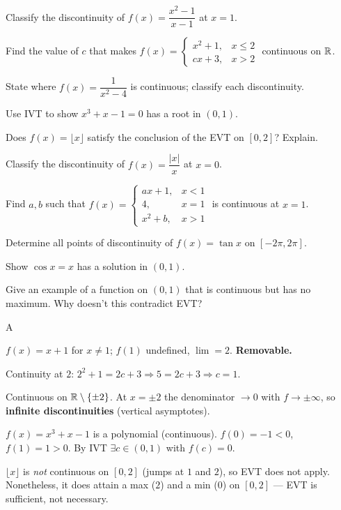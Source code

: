\documentclass[11pt]{article}
\begin{document}
\begin{problems}
\item Classify the discontinuity of $f(x) = \dfrac{x^2 - 1}{x - 1}$ at $x = 1$.
\item Find the value of $c$ that makes
  $f(x) = \begin{cases} x^2 + 1, & x \le 2 \\ cx + 3, & x > 2 \end{cases}$ continuous on $\mathbb{R}$.
\item State where $f(x) = \dfrac{1}{x^2 - 4}$ is continuous; classify each discontinuity.
\item Use IVT to show $x^3 + x - 1 = 0$ has a root in $(0,1)$.
\item Does $f(x) = \lfloor x \rfloor$ satisfy the conclusion of the EVT on $[0,2]$? Explain.
\end{problems}

\vfill
\newpage
{}
\begin{problems}
\item Classify the discontinuity of $f(x) = \dfrac{|x|}{x}$ at $x = 0$.
\item Find $a, b$ such that
  $f(x) = \begin{cases} ax + 1, & x < 1 \\ 4, & x = 1 \\ x^2 + b, & x > 1 \end{cases}$ is continuous at $x = 1$.
\item Determine all points of discontinuity of $f(x) = \tan x$ on $[-2\pi, 2\pi]$.
\item Show $\cos x = x$ has a solution in $(0, 1)$.
\item Give an example of a function on $(0,1)$ that is continuous but has no maximum. Why doesn't this contradict EVT?
\end{problems}

\vfill
\newpage
{}

\begin{answers}{A}
\item $f(x) = x+1$ for $x \ne 1$; $f(1)$ undefined, $\lim = 2$. \textbf{Removable.}
\item Continuity at $2$: $2^2 + 1 = 2c + 3 \Rightarrow 5 = 2c + 3 \Rightarrow \boxed{c = 1}$.
\item Continuous on $\mathbb{R}\setminus\{\pm 2\}$. At $x = \pm 2$ the denominator $\to 0$ with $f \to \pm\infty$, so \textbf{infinite discontinuities} (vertical asymptotes).
\item $f(x)=x^3+x-1$ is a polynomial (continuous). $f(0)=-1<0$, $f(1)=1>0$. By IVT $\exists c\in(0,1)$ with $f(c)=0$.
\item $\lfloor x \rfloor$ is \emph{not} continuous on $[0,2]$ (jumps at $1$ and $2$), so EVT does not apply. Nonetheless, it does attain a max ($2$) and a min ($0$) on $[0,2]$ --- EVT is sufficient, not necessary.
\end{answers}
\end{document}
